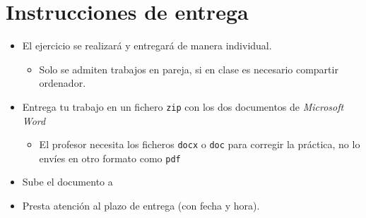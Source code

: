 \section{Instrucciones de entrega}
\begin{itemize}
\item El ejercicio se realizará y entregará de manera individual.
  \begin{itemize}
  \item Solo se admiten trabajos en pareja, si en clase es necesario compartir ordenador.
  \end{itemize}
\item Entrega tu trabajo en un fichero \texttt{zip} con los dos documentos de \textit{Microsoft Word}
  \begin{itemize}
  \item El profesor necesita los ficheros \texttt{docx} o \texttt{doc} para corregir la práctica, no lo envíes en otro formato como \texttt{pdf}
  \end{itemize}

\item Sube el documento a 
\item Presta atención al plazo de entrega (con fecha y hora).
  
\end{itemize}





